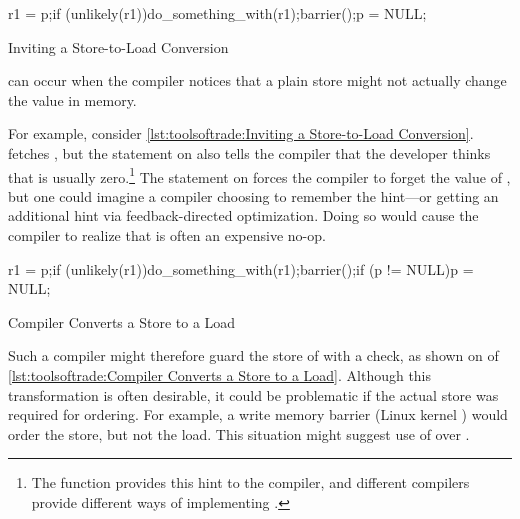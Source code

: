 \begin{description}[labelsep=.4em]
\begin{listing}
\begin{fcvlabel}
\begin{VerbatimLL}[commandchars=\\\[\]]
r1 = p;\lnlbl[load:p]
if (unlikely(r1))\lnlbl[if]
	do_something_with(r1);\lnlbl[dsw]
barrier();\lnlbl[barrier]
p = NULL;\lnlbl[null]
\end{VerbatimLL}
\end{fcvlabel}
\caption{Inviting a Store-to-Load Conversion}
\label{lst:toolsoftrade:Inviting a Store-to-Load Conversion}
\end{listing}

\item[Store-to-load transformations] can occur when the compiler notices
that a plain store might not actually change the value in memory.
\begin{fcvref}
For example, consider
\cref{lst:toolsoftrade:Inviting a Store-to-Load Conversion}.
 fetches , but the  statement on
 also tells the compiler that the developer thinks that
 is usually zero.\footnote{
	The  function provides this hint to the compiler,
	and different compilers provide different ways of implementing
	.}
The  statement on  forces the compiler
to forget the value of , but one could imagine a compiler
choosing to remember the hint---or getting an additional hint via
feedback-directed optimization.
Doing so would cause the compiler to realize that 
is often an expensive no-op.
\end{fcvref}

\begin{listing}
\begin{fcvlabel}
\begin{VerbatimLL}[commandchars=\\\[\]]
r1 = p;\lnlbl[load:p]
if (unlikely(r1))\lnlbl[if]
	do_something_with(r1);\lnlbl[dsw]
barrier();\lnlbl[barrier]
if (p != NULL)\lnlbl[if1]
	p = NULL;\lnlbl[null]
\end{VerbatimLL}
\end{fcvlabel}
\caption{Compiler Converts a Store to a Load}
\label{lst:toolsoftrade:Compiler Converts a Store to a Load}
\end{listing}

\begin{fcvref}
Such a compiler might therefore guard the store of 
with a check, as shown on  of
\cref{lst:toolsoftrade:Compiler Converts a Store to a Load}.
Although this transformation is often desirable, it could be problematic
if the actual store was required for ordering.
For example, a write memory barrier (Linux kernel ) would
order the store, but not the load.
This situation might suggest use of  over
.
\end{fcvref}


\end{description}
